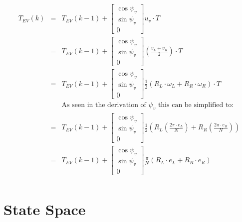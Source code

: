 \documentclass[12pt]{article}
\begin{document}
	\begin{eqnarray}
	{T}_{EV}(k) &=& {T}_{EV}(k-1) + \left[
	\begin{array}{c}
	\cos \psi_v\\
	\sin \psi_v \\
	0
	\end{array}
	\right] u_v \cdot T \nonumber \\
	&=& {T}_{EV}(k-1) + \left[
	\begin{array}{c}
	\cos \psi_v\\
	\sin \psi_v \\
	0
	\end{array}
	\right] \left( \frac{v_L + v_R}{2} \right) \cdot T \nonumber \\
	&=& {T}_{EV}(k-1) + \left[
	\begin{array}{c}
	\cos \psi_v\\
	\sin \psi_v \\
	0
	\end{array}
	\right] \frac{1}{2}(R_L\cdot\omega_L + R_R\cdot\omega_R)\cdot T \nonumber \nonumber \\
	&& \text{As seen in the derivation of $\psi_v$ this can be simplified to:}	\nonumber \\
	&=& {T}_{EV}(k-1) + \left[
	\begin{array}{c}
	\cos \psi_v\\
	\sin \psi_v \\
	0
	\end{array}
	\right] \frac{1}{2}\left(R_L\left(\frac{2\pi \cdot e_L}{N}\right) + R_R\left(\frac{2\pi \cdot e_R}{N}\right)\right) \nonumber  \\
	&=& {T}_{EV}(k-1) + \left[
	\begin{array}{c}
	\cos \psi_v\\
	\sin \psi_v \\
	0
	\end{array}
	\right] \frac{\pi}{N}(R_L\cdot e_L + R_R\cdot e_R) \\
	\nonumber \end{eqnarray}
	
	\section{State Space}
	
\end{document}
